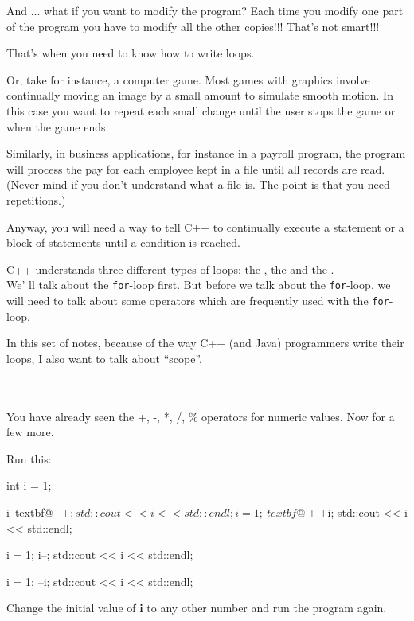 And ... what if you want to modify the program? Each time you modify
one part of the program you have to modify all the other copies!!! That's
not smart!!!

That's when you need to know how to write loops.

Or, take for instance, a computer game. Most games with graphics
involve continually moving an image by a small amount to simulate
smooth motion. In this case you want to repeat each small change until
the user stops the game or when the game ends.

Similarly, in business applications, for instance in a payroll program, the
program will process the pay for each employee kept in a file until all
records are read. (Never mind if you don't understand what a file is. The
point is that you need repetitions.)

Anyway, you will need a way to tell C++ to continually execute a
statement or a block of statements until a condition is reached.

C++ understands three different types of loops: the , the  and the .\\
We' ll talk about the \texttt{for}-loop first. But before we talk about the \texttt{for}-loop, we will need to talk about some operators which are frequently used with the \texttt{for}-loop.

In this set of notes, because of the way C++ (and Java) programmers write their loops, I also want to talk about ``scope''.

\newpage{}\\\\
You have already seen the +, -, *, /, \% operators for numeric values.
Now for a few more.
\begin{ex}
 Run this:
\begin{console}[commandchars=\~\@\$]
{
int i = 1;

i~textbf@++$;
std::cout << i << std::endl;

i = 1;
~textbf@++$i;
std::cout << i << std::endl;

i = 1;
i--;
std::cout << i << std::endl;

i = 1;
--i;
std::cout << i << std::endl;
}
\end{console}
\end{ex}
Change the initial value of \textbf{i} to any other number and run the program again.

